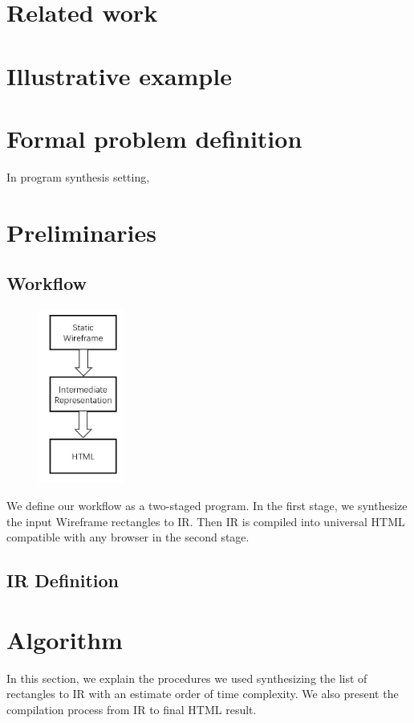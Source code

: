 \documentclass[runningheads]{llncs}
\begin{document}
\section{Related work}

\section{Illustrative example}
\section{Formal problem definition}
In program synthesis setting, 
\section{Preliminaries}
\subsection{Workflow}
\begin{figure}
  \vspace*{-0.5in}
  \includegraphics[width=0.25\textwidth]{src/workflow.JPG}
\end{figure}
We define our workflow as a two-staged program. In the first stage, we synthesize the input Wireframe rectangles to IR. Then IR is compiled into universal HTML compatible with any browser in the second stage. 


\subsection{IR Definition}

\section{Algorithm}
In this section, we explain the procedures we used synthesizing the list of rectangles to IR with an estimate order of time complexity. We also present the compilation process from IR to final HTML result.
\end{document}
